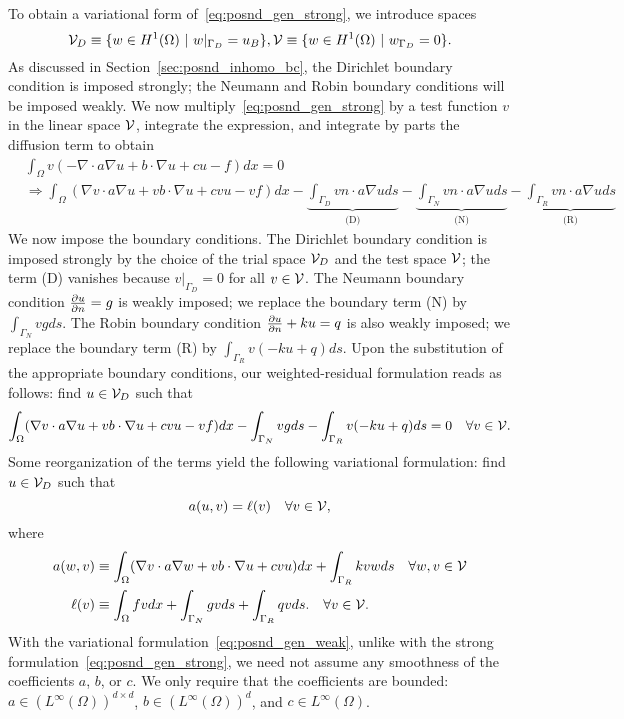 To obtain a variational form of~\eqref{eq:posnd_gen_strong}, we introduce spaces
\begin{equation*}
  \mathcal{V}_D \equiv \{ w \in H^1(\Omega) \ | \ w|_{\Gamma_D} = u_B \}, \\
  \mathcal{V} \equiv \{ w \in H^1(\Omega) \ | \ w_{\Gamma_D} = 0 \}.
\end{equation*}
As discussed in Section~\ref{sec:posnd_inhomo_bc}, the Dirichlet boundary condition is imposed strongly; the Neumann and Robin boundary conditions will be imposed weakly.  We now multiply~\eqref{eq:posnd_gen_strong} by a test function $v$ in the linear space $\mathcal{V}$, integrate the expression, and integrate by parts the diffusion term to obtain
\begin{align*}
  &\int_\Omega v (- \nabla \cdot a \nabla u + b \cdot \nabla u + c u - f) dx = 0 \\
  & \Rightarrow
  \int_\Omega (\nabla v \cdot a \nabla u  + v b \cdot \nabla u + c vu -vf ) dx
  -  \underbrace{\int_{\Gamma_D} v n \cdot a \nabla u ds}_{\text{(D)}}
  - \underbrace{\int_{\Gamma_N} v n \cdot a \nabla u ds}_{\text{(N)}}
  - \underbrace{\int_{\Gamma_R} v n \cdot a \nabla u ds}_{\text{(R)}}
\end{align*}
We now impose the boundary conditions.  The Dirichlet boundary condition is imposed strongly by the choice of the trial space $\mathcal{V}_D$ and the test space $\mathcal{V}$; the term (D) vanishes because $v|_{\Gamma_D} = 0$ for all $v \in \mathcal{V}$.  The Neumann boundary condition $\frac{\partial u}{\partial n} = g$ is weakly imposed; we replace the boundary term (N) by $\int_{\Gamma_N} v g ds$.  The Robin boundary condition $\frac{\partial u}{\partial n} + k u = q$ is also weakly imposed; we replace the boundary term (R) by $\int_{\Gamma_R} v (-ku + q) ds$.  Upon the substitution of the appropriate boundary conditions, our weighted-residual formulation reads as follows: find $u \in \mathcal{V}_D$ such that
\begin{equation*}
  \int_\Omega (\nabla v \cdot a \nabla u  + v b \cdot \nabla u + c vu - vf) dx
  - \int_{\Gamma_N} v g ds - \int_{\Gamma_R} v (-ku + q) ds = 0
  \quad \forall v \in \mathcal{V}.
\end{equation*}
Some reorganization of the terms yield the following variational formulation: find $u \in \mathcal{V}_D$ such that
\begin{equation}
  a(u,v) = \ell(v) \quad \forall v \in \mathcal{V},
  \label{eq:posnd_gen_weak}
\end{equation}
where
\begin{align*}
  a(w,v) &\equiv \int_\Omega (\nabla v \cdot a \nabla w + v b \cdot \nabla u + c vu ) dx + \int_{\Gamma_R} k vw ds \quad \forall w, v \in \mathcal{V} \\
  \ell(v) &\equiv \int_\Omega fv dx + \int_{\Gamma_N} gv ds + \int_{\Gamma_R} qv ds.
  \quad \forall v \in \mathcal{V}.
\end{align*}
With the variational formulation~\eqref{eq:posnd_gen_weak}, unlike with the strong formulation~\eqref{eq:posnd_gen_strong}, we need not assume any smoothness of the coefficients $a$, $b$, or $c$.  We only require that the coefficients are bounded: $a \in (L^\infty(\Omega))^{d \times d}$, $b \in (L^\infty(\Omega))^d$, and $c \in L^\infty(\Omega)$.

